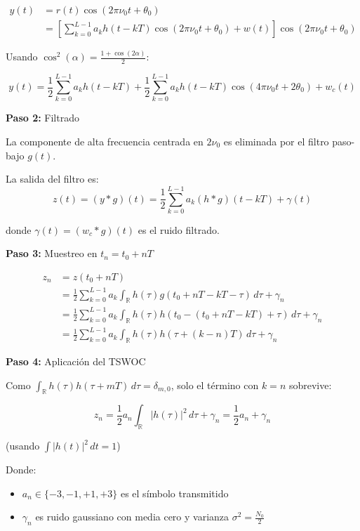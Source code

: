 \documentclass[11pt,a4paper]{article}
\begin{document}
\begin{align*}
y(t) &= r(t) \cos(2\pi\nu_0 t + \theta_0) \\
&= \left[\sum_{k=0}^{L-1} a_k h(t-kT)\cos(2\pi\nu_0 t + \theta_0) + w(t)\right] \cos(2\pi\nu_0 t + \theta_0)
\end{align*}

Usando $\cos^2(\alpha) = \frac{1 + \cos(2\alpha)}{2}$:

\[
y(t) = \frac{1}{2}\sum_{k=0}^{L-1} a_k h(t-kT) + \frac{1}{2}\sum_{k=0}^{L-1} a_k h(t-kT)\cos(4\pi\nu_0 t + 2\theta_0) + w_c(t)
\]

\textbf{Paso 2:} Filtrado

La componente de alta frecuencia centrada en $2\nu_0$ es eliminada por el filtro paso-bajo $g(t)$.

La salida del filtro es:
\[
z(t) = (y * g)(t) = \frac{1}{2}\sum_{k=0}^{L-1} a_k (h * g)(t-kT) + \gamma(t)
\]

donde $\gamma(t) = (w_c * g)(t)$ es el ruido filtrado.

\textbf{Paso 3:} Muestreo en $t_n = t_0 + nT$

\begin{align*}
z_n &= z(t_0 + nT) \\
&= \frac{1}{2}\sum_{k=0}^{L-1} a_k \int_{\mathbb{R}} h(\tau) g(t_0 + nT - kT - \tau)\, d\tau + \gamma_n \\
&= \frac{1}{2}\sum_{k=0}^{L-1} a_k \int_{\mathbb{R}} h(\tau) h(t_0 - (t_0 + nT - kT) + \tau)\, d\tau + \gamma_n \\
&= \frac{1}{2}\sum_{k=0}^{L-1} a_k \int_{\mathbb{R}} h(\tau) h(\tau + (k-n)T)\, d\tau + \gamma_n
\end{align*}

\textbf{Paso 4:} Aplicaci\'on del TSWOC

Como $\int_{\mathbb{R}} h(\tau) h(\tau + mT)\, d\tau = \delta_{m,0}$, solo el t\'ermino con $k = n$ sobrevive:

\[
\boxed{z_n = \frac{1}{2} a_n \int_{\mathbb{R}} |h(\tau)|^2\, d\tau + \gamma_n = \frac{1}{2} a_n + \gamma_n}
\]

(usando $\int |h(t)|^2\, dt = 1$)

Donde:
\begin{itemize}
    \item $a_n \in \{-3, -1, +1, +3\}$ es el s\'imbolo transmitido
    \item $\gamma_n$ es ruido gaussiano con media cero y varianza $\sigma^2 = \frac{N_0}{2}$
\end{itemize}
\end{document}
